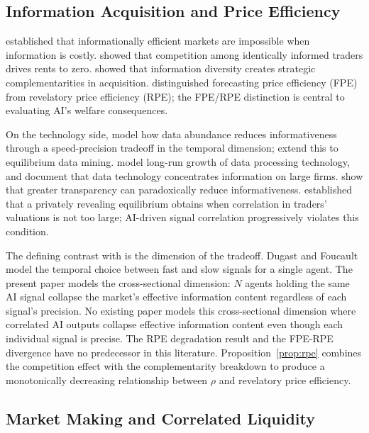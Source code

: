 \subsection{Information Acquisition and Price Efficiency}

\citet{grossman1980} established that informationally efficient markets are impossible when information is costly. \citet{holden1992} showed that competition among identically informed traders drives rents to zero. \citet{goldstein2015} showed that information diversity creates strategic complementarities in acquisition. \citet{bond2012} distinguished forecasting price efficiency (FPE) from revelatory price efficiency (RPE); the FPE/RPE distinction is central to evaluating AI's welfare consequences.

On the technology side, \citet{dugast2018} model how data abundance reduces informativeness through a speed-precision tradeoff in the temporal dimension; \citet{dugast2025} extend this to equilibrium data mining. \citet{farboodi2020} model long-run growth of data processing technology, and \citet{farboodi2022} document that data technology concentrates information on large firms. \citet{banerjee2018} show that greater transparency can paradoxically reduce informativeness. \citet{vives2014} established that a privately revealing equilibrium obtains when correlation in traders' valuations is not too large; AI-driven signal correlation progressively violates this condition.

The defining contrast with \citet{dugast2018} is the dimension of the tradeoff. Dugast and Foucault model the temporal choice between fast and slow signals for a single agent. The present paper models the cross-sectional dimension: $N$ agents holding the same AI signal collapse the market's effective information content regardless of each signal's precision. No existing paper models this cross-sectional dimension where correlated AI outputs collapse effective information content even though each individual signal is precise. The RPE degradation result and the FPE-RPE divergence have no predecessor in this literature. Proposition~\ref{prop:rpe} combines the \citet{holden1992} competition effect with the \citet{goldstein2015} complementarity breakdown to produce a monotonically decreasing relationship between $\rho$ and revelatory price efficiency.

\subsection{Market Making and Correlated Liquidity}

